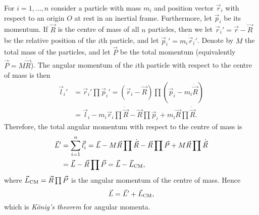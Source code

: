 \documentclass[article, a4paper, 11pt, oneside]{memoir}
\numberwithin{equation}{chapter}
\begin{document}
\begin{remarkbreak}
    For $i = 1, \ldots, n$ consider a particle with mass $m_i$ and position vector $\vec{r}_i$ with respect to an origin $O$ at rest in an inertial frame. Furthermore, let $\vec{p}_i$ be its momentum. If $\vec{R}$ is the centre of mass of all $n$ particles, then we let $\vec{r}_i' = \vec{r} - \vec{R}$ be the relative position of the $i$th particle, and let $\vec{p}_i' = m_i \dot{\vec{r}}_i'$. Denote by $M$ the total mass of the particles, and let $\vec{P}$ be the total momentum (equivalently $\vec{P} = M \dot{\vec{R}}$). The angular momentum of the $i$th particle with respect to the centre of mass is then
    \begin{align*}
        \vec{l}_i'
            &= \vec{r}_i' \prod \vec{p}_i'
             = (\vec{r}_i - \vec{R}) \prod (\vec{p}_i - m_i \dot{\vec{R}}) \\
            &= \vec{l}_i - m_i \vec{r}_i \prod \dot{\vec{R}} - \vec{R} \prod \vec{p}_i + m_i \vec{R} \prod \dot{\vec{R}}.
    \end{align*}
    Therefore, the total angular momentum with respect to the centre of mass is
    \begin{align*}
        \vec{L}'
            &= \sum_{i=1}^n \vec{l}_i'
             = \vec{L} - M \vec{R} \prod \dot{\vec{R}} - \vec{R} \prod \vec{P} + M \vec{R} \prod \dot{\vec{R}} \\
            &= \vec{L} - \vec{R} \prod \vec{P}
             = \vec{L} - \vec{L}_{\mathrm{CM}},
    \end{align*}
    where $\vec{L}_{\mathrm{CM}} = \vec{R} \prod \vec{P}$ is the angular momentum of the centre of mass. Hence
    \begin{equation*}
        \vec{L} = \vec{L}' + \vec{L}_{\mathrm{CM}},
    \end{equation*}
    which is \emph{König's theorem} for angular momenta.
\end{remarkbreak}
\end{document}
